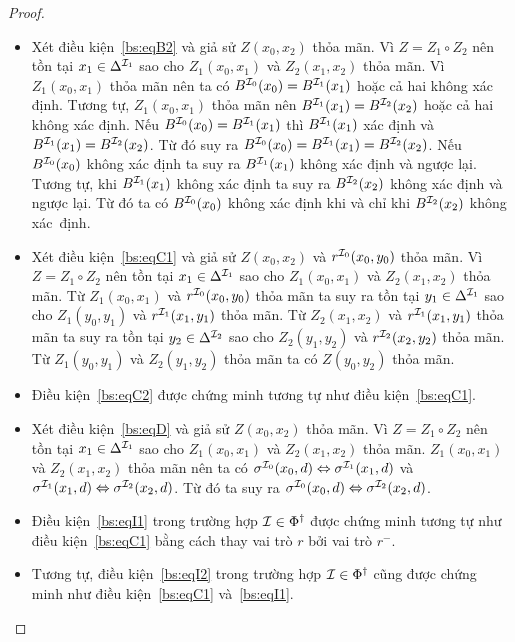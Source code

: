 \begin{proof}
\begin{itemize}
		\item Xét điều kiện~\eqref{bs:eqB2} và giả sử $Z(x_0, x_2)$ thỏa mãn. Vì $Z = Z_1 \circ Z_2$ nên tồn tại $x_1 \in \Delta^{\mathcal{I}_1}$ sao cho $Z_1(x_0, x_1)$ và $Z_2(x_1, x_2)$ thỏa mãn. Vì $Z_1(x_0,x_1)$ thỏa mãn nên ta có $B^{\mathcal{I}_0}(x_0) = B^{\mathcal{I}_1}(x_1)$ hoặc cả hai không xác định. Tương tự, $Z_1(x_0,x_1)$ thỏa mãn nên $B^{\mathcal{I}_1}(x_1) = B^{\mathcal{I}_2}(x_2)$ hoặc cả hai không xác định. 
		Nếu $B^{\mathcal{I}_0}(x_0) = B^{\mathcal{I}_1}(x_1)$ thì $B^{\mathcal{I}_1}(x_1)$ xác định và $B^{\mathcal{I}_1}(x_1) = B^{\mathcal{I}_2}(x_2)$. Từ đó suy ra $B^{\mathcal{I}_0}(x_0) = B^{\mathcal{I}_1}(x_1) = B^{\mathcal{I}_2}(x_2)$.
		Nếu $B^{\mathcal{I}_0}(x_0)$ không xác định ta suy ra  $B^{\mathcal{I}_1}(x_1)$ không xác định và ngược lại. Tương tự, khi $B^{\mathcal{I}_1}(x_1)$ không xác định ta suy ra  $B^{\mathcal{I}_2}(x_2)$ không xác định và ngược lại. Từ đó ta có $B^{\mathcal{I}_0}(x_0)$ không xác định khi và chỉ khi $B^{\mathcal{I}_2}(x_2)$ không xác~định.
		
		\item Xét điều kiện~\eqref{bs:eqC1} và giả sử $Z(x_0, x_2)$ và $r^{\mathcal{I}_0}(x_0, y_0)$ thỏa mãn. Vì $Z = Z_1 \circ Z_2$ nên tồn tại $x_1 \in \Delta^{\mathcal{I}_1}$ sao cho $Z_1(x_0,x_1)$ và $Z_2(x_1,x_2)$ thỏa mãn. Từ $Z_1(x_0,x_1)$ và $r^{\mathcal{I}_0}(x_0, y_0)$ thỏa mãn ta suy ra tồn tại $y_1 \in \Delta^{\mathcal{I}_1}$ sao cho $Z_1(y_0, y_1)$ và $r^{\mathcal{I}_1}(x_1, y_1)$ thỏa mãn. Từ $Z_2(x_1,x_2)$ và $r^{\mathcal{I}_1}(x_1, y_1)$ thỏa mãn ta suy ra tồn tại $y_2 \in \Delta^{\mathcal{I}_2}$ sao cho $Z_2(y_1, y_2)$ và $r^{\mathcal{I}_2}(x_2, y_2)$ thỏa mãn. Từ $Z_1(y_0,y_1)$ và $Z_2(y_1,y_2)$ thỏa mãn ta có $Z(y_0,y_2)$ thỏa mãn.
		
		\item Điều kiện~\eqref{bs:eqC2} được chứng minh tương tự như điều kiện~\eqref{bs:eqC1}.
		
		\item Xét điều kiện~\eqref{bs:eqD} và giả sử $Z(x_0,x_2)$ thỏa mãn. Vì $Z = Z_1 \circ Z_2$ nên tồn tại $x_1 \in \Delta^{\mathcal{I}_1}$ sao cho $Z_1(x_0,x_1)$ và $Z_2(x_1, x_2)$ thỏa mãn. $Z_1(x_0,x_1)$ và $Z_2(x_1,x_2)$ thỏa mãn nên ta có $\sigma^{\mathcal{I}_0}(x_0, d) \Leftrightarrow \sigma^{\mathcal{I}_1}(x_1,d)$ và $\sigma^{\mathcal{I}_1}(x_1, d) \Leftrightarrow \sigma^{\mathcal{I}_2}(x_2,d)$. Từ đó ta suy ra $\sigma^{\mathcal{I}_0}(x_0, d) \Leftrightarrow \sigma^{\mathcal{I}_2}(x_2,d)$.
		
		\item Điều kiện~\eqref{bs:eqI1} trong trường hợp $\mathcal{I} \in \Phi^\dag$ được chứng minh tương tự như điều kiện~\eqref{bs:eqC1} bằng cách thay vai trò $r$ bởi vai trò $r^-$.
		
		\item Tương tự, điều kiện~\eqref{bs:eqI2} trong trường hợp $\mathcal{I} \in \Phi^\dag$ cũng được chứng minh như điều kiện~\eqref{bs:eqC1} và~\eqref{bs:eqI1}.
		

\end{itemize}
\end{proof}
